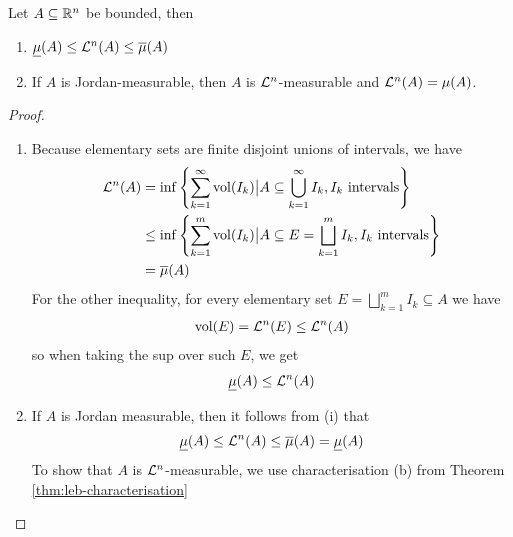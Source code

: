 \begin{thm}[]
Let $A \subseteq \mathbb{R}^{n}$ be bounded, then
\begin{enumerate}
  \item $\underline{\mu}(A) \leq\mathcal{L}^{n}(A) \leq \overline{\mu}(A)$
  \item If $A$ is Jordan-measurable, then $A$ is $\mathcal{L}^{n}$-measurable and $\mathcal{L}^{n}(A) = \mu(A)$.
\end{enumerate}
\end{thm}
\begin{proof}
\begin{enumerate}
  \item Because elementary sets are finite disjoint unions of intervals, we have
    \begin{align*}
      \mathcal{L}^{n}(A) 
      &= \inf \left\{
        \sum_{k=1}^{\infty}\operatorname{vol}(I_k) \big\vert A \subseteq \bigcup_{k=1}^{\infty}I_k, I_k \text{ intervals}
      \right\}
      \\
      &\leq
      \inf \left\{
        \sum_{k=1}^{m}\operatorname{vol}(I_k) \big\vert A \subseteq E = \bigsqcup_{k=1}^{m}I_k, I_k \text{ intervals}
      \right\}
      \\
      &= \overline{\mu}(A)
    \end{align*}
    For the other inequality, for every elementary set $E = \bigsqcup_{k=1}^{m}I_k \subseteq A$ we have
    \begin{align*}
      \operatorname{vol}(E) = \mathcal{L}^{n}(E) \leq \mathcal{L}^{n}(A)
    \end{align*}
    so when taking the sup over such $E$, we get
    \begin{align*}
      \underline{\mu}(A) \leq \mathcal{L}^{n}(A)
    \end{align*}


  \item If $A$ is Jordan measurable, then it follows from (i) that
    \begin{align*}
      \underline{\mu}(A) \leq \mathcal{L}^{n}(A) \leq \overline{\mu}(A) = \underline{\mu}(A)
    \end{align*}
    To show that $A$ is $\mathcal{L}^{n}$-measurable, we use characterisation (b) from Theorem \ref{thm:leb-characterisation}


\end{enumerate}
\end{proof}
